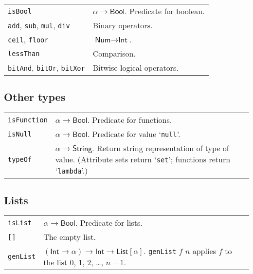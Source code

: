 \documentclass[9pt, a4paper, landscape]{extarticle}
\newcommand{\cmd}[1]{\texttt{#1}}
\newcommand{\str}{\textsf{String}}
\newcommand{\itg}{\textsf{Int}} %
\newcommand{\num}{\textsf{Num}} %
\newcommand{\lst}{\textsf{List}}
\newcommand{\bln}{\textsf{Bool}}
\begin{document}
\begin{multicols*}{3}
\begin{tabularx}{\columnwidth}{@{}l>{\raggedright\arraybackslash}X@{}}
  \cmd{isBool} & $\alpha\to\bln$. Predicate for boolean. \\

  \cmd{add}, \cmd{sub}, \cmd{mul}, \cmd{div} & Binary operators. \\

  \cmd{ceil}, \cmd{floor} & $\num\to\itg$. \\

  \cmd{lessThan} & Comparison. \\

  \cmd{bitAnd}, \cmd{bitOr}, \cmd{bitXor} & Bitwise logical
  operators. \\
\end{tabularx}


\subsection*{Other types}

\begin{tabularx}{\columnwidth}{@{}l>{\raggedright\arraybackslash}X@{}}
  \cmd{isFunction} & $\alpha\to\bln$. Predicate for functions. \\

  \cmd{isNull} & $\alpha\to\bln$. Predicate for value `\cmd{null}'. \\

  \cmd{typeOf} & $\alpha\to\str$. Return string representation of type of
  value. (Attribute sets return `\cmd{set}'; functions return
  `\cmd{lambda}'.) \\
  
\end{tabularx}



\subsection*{Lists}
\begin{tabularx}{\columnwidth}{@{}l>{\raggedright\arraybackslash}X@{}}
  \cmd{isList}      & $\alpha\to\bln$. Predicate for lists. \\
  \cmd{[]}          & The empty list. \\
  \cmd{genList}     & $(\itg\to\alpha)\to\itg\to\lst[\alpha]$.\newline
  \cmd{genList} $f$ $n$ applies $f$ to the list 0, 1, 2, \dots, $n-1$. \\


\end{tabularx}
\end{multicols*}
\end{document}
